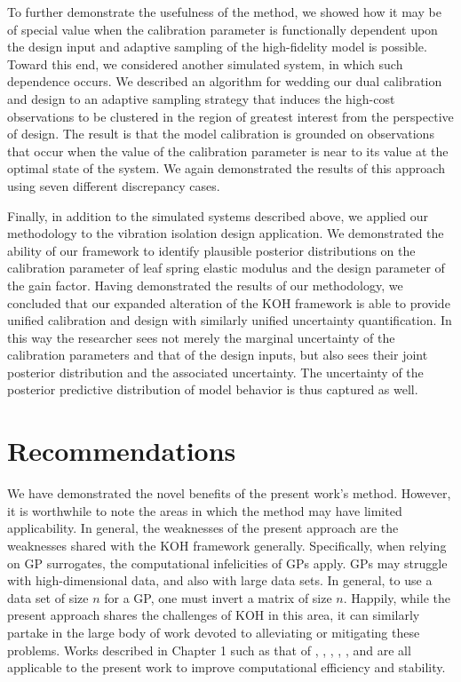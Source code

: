 \documentclass[12pt]{article}
\begin{document}
To further demonstrate the usefulness of the method, we showed how it may be of special value when the calibration parameter is functionally dependent upon the design input and adaptive sampling of the high-fidelity model is possible.
Toward this end, we considered another simulated system, in which such dependence occurs.
We described an algorithm for wedding our dual calibration and design to an adaptive sampling strategy that induces the high-cost observations to be clustered in the region of greatest interest from the perspective of design.
The result is that the model calibration is grounded on observations that occur when the value of the calibration parameter is near to its value at the optimal state of the system.
We again demonstrated the results of this approach using seven different discrepancy cases.

Finally, in addition to the simulated systems described above, we applied our methodology to the vibration isolation design application.
We demonstrated the ability of our framework to identify plausible posterior distributions on the calibration parameter of leaf spring elastic modulus and the design parameter of the gain factor.
Having demonstrated the results of our methodology, we concluded that our expanded alteration of the KOH framework is able to provide unified calibration and design with similarly unified uncertainty quantification.
In this way the researcher sees not merely the marginal uncertainty of the calibration parameters and that of the design inputs, but also sees their joint posterior distribution and the associated uncertainty.
The uncertainty of the posterior predictive distribution of model behavior is thus captured as well.


\section{Recommendations}

We have demonstrated the novel benefits of the present work's method.
However, it is worthwhile to note the areas in which the method may have limited applicability.
In general, the weaknesses of the present approach are the weaknesses shared with the KOH framework generally.
Specifically, when relying on GP surrogates, the computational infelicities of GPs apply.
GPs may struggle with high-dimensional data, and also with large data sets.
In general, to use a data set of size $n$ for a GP, one must invert a matrix of size $n$.
Happily, while the present approach shares the challenges of KOH in this area, it can similarly partake in the large body of work devoted to alleviating or mitigating these problems.
Works described in Chapter 1 such as that of  \citet{Higdon2008a}, \citet{Bhat2010}, \citet{Paulo2012}, \citet{Drignei2012}, \citet{Pratola2013}, and \citet{Higdon2013} are all applicable to the present work to improve computational efficiency and stability.
\end{document}
